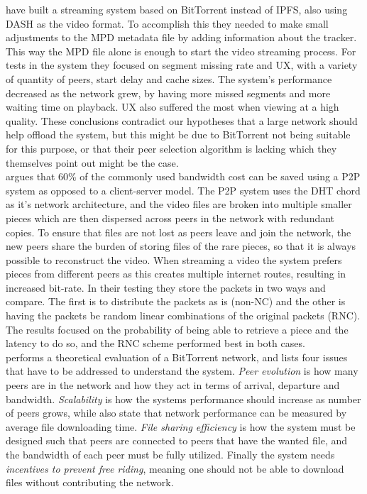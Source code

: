 \citeauthor{gazdar2017toward} \cite{gazdar2017toward} have built a streaming system based on BitTorrent instead of \ac{IPFS}, also using \ac{DASH} as the video format. To accomplish this they needed to make small adjustments to the \ac{MPD} metadata file by adding information about the tracker. This way the \ac{MPD} file alone is enough to start the video streaming process. For tests in the system they focused on segment missing rate and \ac{UX}, with a variety of quantity of peers, start delay and cache sizes. The system's performance decreased as the network grew, by having more missed segments and more waiting time on playback. \ac{UX} also suffered the most when viewing at a high quality. These conclusions contradict our hypotheses that a large network should help offload the system, but this might be due to BitTorrent not being suitable for this purpose, or that their peer selection algorithm is lacking which they themselves point out might be the case.
\\


\citeauthor{nguyen2009p2p} \cite{nguyen2009p2p} argues that 60\% of the commonly used bandwidth cost can be saved using a \ac{P2P} system as opposed to a client-server model. The \ac{P2P} system uses the \ac{DHT} chord as it's network architecture, and the video files are broken into multiple smaller pieces which are then dispersed across peers in the network with redundant copies. To ensure that files are not lost as peers leave and join the network, the new peers share the burden of storing files of the rare pieces, so that it is always possible to reconstruct the video. When streaming a video the system prefers pieces from different peers as this creates multiple internet routes, resulting in increased bit-rate. In their testing they store the packets in two ways and compare. The first is to distribute the packets as is (non-\ac{NC}) and the other is having the packets be random linear combinations of the original packets (\ac{RNC}). The results focused on the probability of being able to retrieve a piece and the latency to do so, and  the \ac{RNC} scheme performed best in both cases.
\\


\citeauthor{qiu2004modeling} \cite{qiu2004modeling} performs a theoretical evaluation of a BitTorrent network, and lists four issues that have to be addressed to understand the system.
\emph{Peer evolution} is how many peers are in the network and how they act in terms of arrival, departure and bandwidth.
\emph{Scalability} is how the systems performance should increase as number of peers grows, while also state that network performance can be measured by average file downloading time.
\emph{File sharing efficiency} is how the system must be designed such that peers are connected to peers that have the wanted file, and the bandwidth of each peer must be fully utilized.
Finally the system needs \emph{incentives to prevent free riding}, meaning one should not be able to download files without contributing the network.

